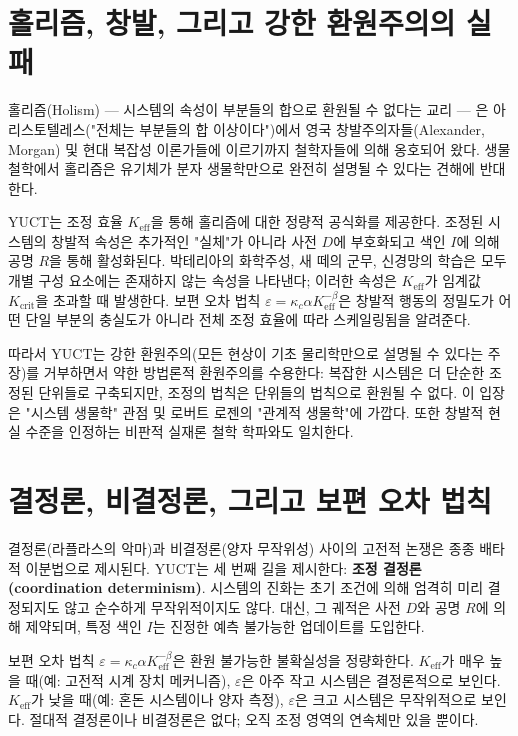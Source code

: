 \documentclass[12pt,a4paper]{article}
\begin{document}
	\section{홀리즘, 창발, 그리고 강한 환원주의의 실패}
	
	홀리즘(Holism) — 시스템의 속성이 부분들의 합으로 환원될 수 없다는 교리 — 은 아리스토텔레스("전체는 부분들의 합 이상이다")에서 영국 창발주의자들(Alexander, Morgan) 및 현대 복잡성 이론가들에 이르기까지 철학자들에 의해 옹호되어 왔다. 생물 철학에서 홀리즘은 유기체가 분자 생물학만으로 완전히 설명될 수 있다는 견해에 반대한다.
	
	YUCT는 조정 효율 \(K_{\mathrm{eff}}\)을 통해 홀리즘에 대한 정량적 공식화를 제공한다. 조정된 시스템의 창발적 속성은 추가적인 "실체"가 아니라 사전 \(D\)에 부호화되고 색인 \(I\)에 의해 공명 \(R\)을 통해 활성화된다. 박테리아의 화학주성, 새 떼의 군무, 신경망의 학습은 모두 개별 구성 요소에는 존재하지 않는 속성을 나타낸다; 이러한 속성은 \(K_{\mathrm{eff}}\)가 임계값 \(K_{\mathrm{crit}}\)을 초과할 때 발생한다. 보편 오차 법칙 \(\varepsilon = \kappa_c \alpha K_{\mathrm{eff}}^{-\beta}\)은 창발적 행동의 정밀도가 어떤 단일 부분의 충실도가 아니라 전체 조정 효율에 따라 스케일링됨을 알려준다.
	
	따라서 YUCT는 강한 환원주의(모든 현상이 기초 물리학만으로 설명될 수 있다는 주장)를 거부하면서 약한 방법론적 환원주의를 수용한다: 복잡한 시스템은 더 단순한 조정된 단위들로 구축되지만, 조정의 법칙은 단위들의 법칙으로 환원될 수 없다. 이 입장은 "시스템 생물학" 관점 및 로버트 로젠의 "관계적 생물학"에 가깝다. 또한 창발적 현실 수준을 인정하는 비판적 실재론 철학 학파와도 일치한다.
	
	\section{결정론, 비결정론, 그리고 보편 오차 법칙}
	
	결정론(라플라스의 악마)과 비결정론(양자 무작위성) 사이의 고전적 논쟁은 종종 배타적 이분법으로 제시된다. YUCT는 세 번째 길을 제시한다: \textbf{조정 결정론(coordination determinism)}. 시스템의 진화는 초기 조건에 의해 엄격히 미리 결정되지도 않고 순수하게 무작위적이지도 않다. 대신, 그 궤적은 사전 \(D\)와 공명 \(R\)에 의해 제약되며, 특정 색인 \(I\)는 진정한 예측 불가능한 업데이트를 도입한다.
	
	보편 오차 법칙 \(\varepsilon = \kappa_c \alpha K_{\mathrm{eff}}^{-\beta}\)은 환원 불가능한 불확실성을 정량화한다. \(K_{\mathrm{eff}}\)가 매우 높을 때(예: 고전적 시계 장치 메커니즘), \(\varepsilon\)은 아주 작고 시스템은 결정론적으로 보인다. \(K_{\mathrm{eff}}\)가 낮을 때(예: 혼돈 시스템이나 양자 측정), \(\varepsilon\)은 크고 시스템은 무작위적으로 보인다. 절대적 결정론이나 비결정론은 없다; 오직 조정 영역의 연속체만 있을 뿐이다.
	
\end{document}
